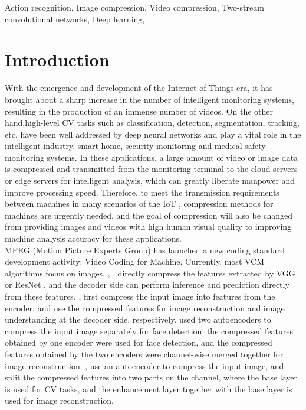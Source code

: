 \documentclass[a4paper]{cas-sc}
\begin{document}
\begin{keywords}
  Action recognition\sep 
  Image compression\sep
  Video compression\sep
  Two-stream convolutional networks\sep 
  Deep learning\sep
\end{keywords}

\maketitle

\section{Introduction}
With the emergence and development of the Internet of Things era,
it has brought about a sharp increase in the number of intelligent monitoring systems, 
resulting in the production of an immense number of videos. 
On the other hand,high-level CV tasks such as classification, detection, segmentation, tracking, etc,
have been well addressed by deep neural networks and play
a vital role in the intelligent industry, smart home, security
monitoring and medical safety monitoring systems. 
In these applications, a large amount of video or image data is compressed and transmitted from the monitoring terminal to the cloud 
servers or edge servers for intelligent analysis, which can greatly liberate manpower and improve processing speed. 
Therefore, to meet the transmission requirements between machines in many scenarios of the IoT , 
compression methods for machines are urgently needed, and the goal of compression will also be changed from providing images and videos 
with high human visual quality to  improving machine analysis accuracy for these applications.\\

MPEG (Motion Picture Experts Group) has launched a new coding standard development activity: 
Video Coding for Machine. Currently, most VCM algorithms focus on images. 
\cite{duan2020video}, \cite{chen2019toward}, \cite{singh2020end} directly compress the features extracted by VGG \cite{simonyan2014very}
or ResNet \cite{he2016deep}, 
and the decoder side can perform inference and prediction directly from these features. 
\cite{torfason2018towards}, \cite{shen2018codedvision} first compress the input image into features from the encoder, and use the compressed features for 
image reconstruction and image understanding at the decoder side, respectively. \cite{hu2020towards} used two autoencoders to compress the 
input image separately for face detection, the compressed features obtained by one encoder were used for face detection, 
and the compressed features obtained by the two encoders were channel-wise merged together for image reconstruction. 
\cite{choi2021latent}, \cite{choi2022scalable} use an autoencoder to compress the input image, and split the compressed features into two parts on the channel, 
where the base layer is used for CV tasks, and the enhancement layer together with the base 
layer is used for image reconstruction.\\
\end{document}
